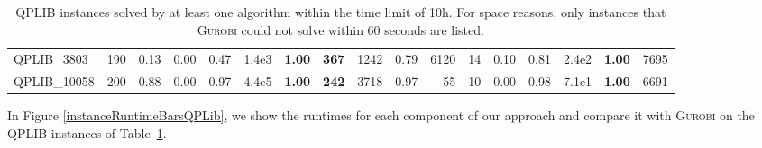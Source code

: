 \documentclass[twoside]{article}
\begin{document}
\begin{table}[h!]
{\begin{tabular}{lrcc|crcr|rcrrccrcr}
				QPLIB\_3803 & 190 & 0.13 & 0.00 & 0.47 & 1.4e3 & \textbf{1.00} & \textbf{367} & 1242 & 0.79 & 6120 & 14 & 0.10 & 0.81 & 2.4e2 & \textbf{1.00} & 7695 \\
				QPLIB\_10058 & 200 & 0.88 & 0.00 & 0.97 & 4.4e5 & \textbf{1.00} & \textbf{242} & 3718 & 0.97 & 55 & 10 & 0.00 & 0.98 & 7.1e1 & \textbf{1.00} & 6691 \\
				\bottomrule
		\end{tabular}}
		\caption{QPLIB instances solved by at least one algorithm within the time
			limit of 10h. For space reasons, only instances that \textsc{Gurobi} could not
			solve within 60 seconds are listed.}
		\label{tableQPLIB_mod}
	\end{table}
	
	
	
	In Figure \ref{instanceRuntimeBarsQPLib}, we show the runtimes for each component of our approach and compare it with \textsc{Gurobi} on the QPLIB instances of Table~\ref{tableQPLIB_mod}. %
	
\end{document}
